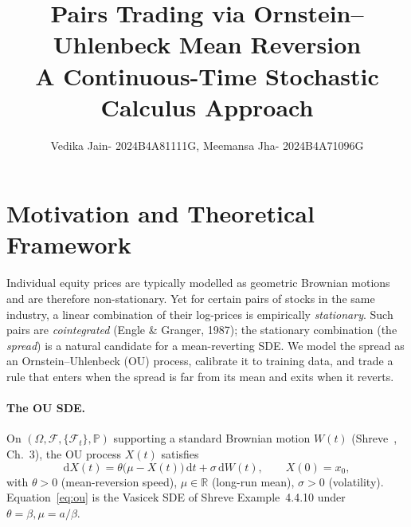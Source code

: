 \documentclass[11pt,a4paper]{article}
\title{\vspace{-2.5em}\textbf{\large Pairs Trading via Ornstein--Uhlenbeck Mean Reversion}\\[-2pt]
{\normalsize A Continuous-Time Stochastic Calculus Approach}}
\author{\normalsize Vedika Jain- 2024B4A81111G, Meemansa Jha- 2024B4A71096G}
\affil{\footnotesize Stochastic Calculus for Finance -- Course Project}
\date{\vspace{-1.5em}}
\newcommand{\dd}{\mathrm{d}}
\newcommand{\R}{\mathbb{R}}
\begin{document}
\maketitle
\vspace{-2.8em}

\section{Motivation and Theoretical Framework}

Individual equity prices are typically modelled as geometric Brownian motions
and are therefore non-stationary. Yet for certain pairs of stocks in the same
industry, a linear combination of their log-prices is empirically
\emph{stationary}. Such pairs are \emph{cointegrated} (Engle \& Granger, 1987);
the stationary combination (the \emph{spread}) is a natural candidate for a
mean-reverting SDE. We model the spread as an Ornstein--Uhlenbeck (OU) process,
calibrate it to training data, and trade a rule that enters when the spread
is far from its mean and exits when it reverts.

\paragraph{The OU SDE.} On $(\Omega, \mathcal{F}, \{\mathcal{F}_t\}, \mathbb{P})$
supporting a standard Brownian motion $W(t)$ (Shreve~\cite{shreve2004}, Ch.~3), the
OU process $X(t)$ satisfies
\begin{equation}
    \dd X(t) = \theta\bigl(\mu - X(t)\bigr)\,\dd t + \sigma\,\dd W(t), \qquad X(0)=x_0,
    \label{eq:ou}
\end{equation}
with $\theta>0$ (mean-reversion speed), $\mu\in\R$ (long-run mean), $\sigma>0$
(volatility). Equation~\eqref{eq:ou} is the Vasicek SDE of Shreve
Example~4.4.10 under $\theta\!=\!\beta,\mu\!=\!a/\beta$.
\end{document}
